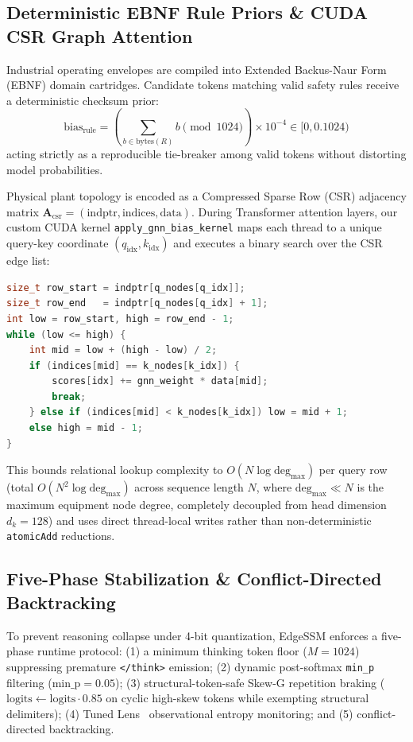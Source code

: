 \documentclass[journal]{IEEEtran}
\begin{document}
\subsection{Deterministic EBNF Rule Priors \& CUDA CSR Graph Attention}
Industrial operating envelopes are compiled into Extended Backus-Naur Form (EBNF) domain cartridges. Candidate tokens matching valid safety rules receive a deterministic checksum prior:
\begin{equation}
\text{bias}_{\text{rule}} = \left( \sum_{b \in \mathrm{bytes}(R)} b \pmod{1024} \right) \times 10^{-4} \in [0, 0.1024)
\end{equation}
acting strictly as a reproducible tie-breaker among valid tokens without distorting model probabilities.

Physical plant topology is encoded as a Compressed Sparse Row (CSR) adjacency matrix $\mathbf{A}_{\text{csr}} = (\text{indptr}, \text{indices}, \text{data})$. During Transformer attention layers, our custom CUDA kernel \texttt{apply\_gnn\_bias\_kernel} maps each thread to a unique query-key coordinate $(q_{\text{idx}}, k_{\text{idx}})$ and executes a binary search over the CSR edge list:
\begin{lstlisting}[language=C++]
size_t row_start = indptr[q_nodes[q_idx]];
size_t row_end   = indptr[q_nodes[q_idx] + 1];
int low = row_start, high = row_end - 1;
while (low <= high) {
    int mid = low + (high - low) / 2;
    if (indices[mid] == k_nodes[k_idx]) {
        scores[idx] += gnn_weight * data[mid];
        break;
    } else if (indices[mid] < k_nodes[k_idx]) low = mid + 1;
    else high = mid - 1;
}
\end{lstlisting}
This bounds relational lookup complexity to $O(N \log \text{deg}_{\max})$ per query row (total $O(N^2 \log \text{deg}_{\max})$ across sequence length $N$, where $\text{deg}_{\max} \ll N$ is the maximum equipment node degree, completely decoupled from head dimension $d_k=128$) and uses direct thread-local writes rather than non-deterministic \texttt{atomicAdd} reductions.

\subsection{Five-Phase Stabilization \& Conflict-Directed Backtracking}
To prevent reasoning collapse under 4-bit quantization, EdgeSSM enforces a five-phase runtime protocol: (1) a minimum thinking token floor ($M=1024$) suppressing premature \texttt{</think>} emission; (2) dynamic post-softmax \texttt{min\_p} filtering ($\text{min\_p}=0.05$); (3) structural-token-safe Skew-G repetition braking ($\text{logits} \leftarrow \text{logits} \cdot 0.85$ on cyclic high-skew tokens while exempting structural delimiters); (4) Tuned Lens~\cite{belrose2023tunedlens} observational entropy monitoring; and (5) conflict-directed backtracking.
\end{document}
